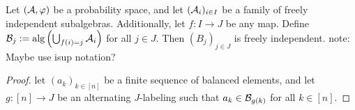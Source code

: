\begin{lemma}
  \label{lem:freeIndep_iUnion}
  Let \((\mathcal{A},\varphi)\) be a probability space, and let \((\mathcal{A}_i)_{i\in I}\) be a family of
  freely independent subalgebras. Additionally, let \(f:I \rightarrow J\) be any map.
  Define \(\mathcal{B}_j := \text{alg}\left(\bigcup_{f(i)=j} \mathcal{A}_i\right)\) for all \(j\in J\).
  Then \((B_j)_{j\in J}\) is freely independent. note: Maybe use isup notation?
\end{lemma}
\begin{proof}
  let \((a_k)_{k\in[n]}\) be a finite sequence of balanced elements, and let \(g:[n]\rightarrow J\)
  be an alternating \(J\)-labeling such that \(a_k \in \mathcal{B}_{g(k)}\) for all \(k \in [n]\).


\end{proof}
